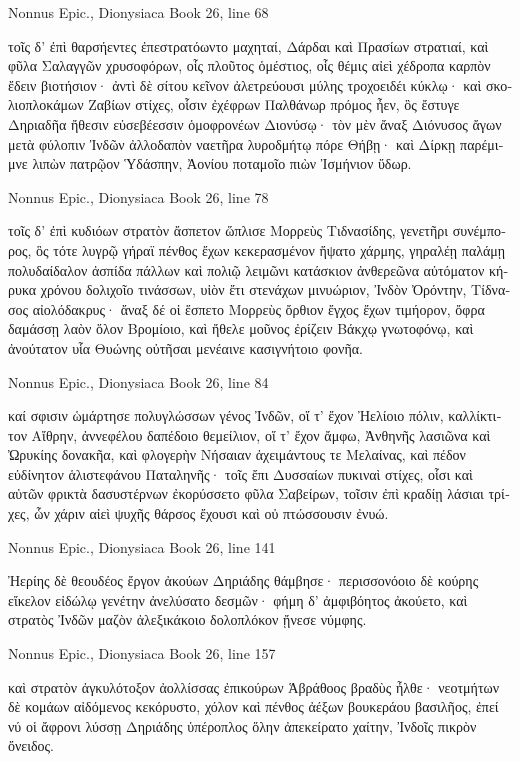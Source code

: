 \documentclass[12pt,letterpaper,twoside,final]{memoir}
\begin{document}
\begin{greek}
Nonnus Epic., Dionysiaca 
Book 26, line 68

τοῖς δ' ἐπὶ θαρσήεντες ἐπεστρατόωντο μαχηταί, 
Δάρδαι καὶ Πρασίων στρατιαί, καὶ φῦλα Σαλαγγῶν 
χρυσοφόρων, οἷς πλοῦτος ὁμέστιος, οἷς θέμις αἰεὶ 
χέδροπα καρπὸν ἔδειν βιοτήσιον· ἀντὶ δὲ σίτου 
κεῖνον ἀλετρεύουσι μύλης τροχοειδέι κύκλῳ· 
καὶ σκολιοπλοκάμων Ζαβίων στίχες, οἷσιν ἐχέφρων 
Παλθάνωρ πρόμος ἦεν, ὃς ἔστυγε Δηριαδῆα 
ἤθεσιν εὐσεβέεσσιν ὁμοφρονέων Διονύσῳ· 
τὸν μὲν ἄναξ Διόνυσος ἄγων μετὰ φύλοπιν Ἰνδῶν 
ἀλλοδαπὸν ναετῆρα λυροδμήτῳ πόρε Θήβῃ· 
καὶ Δίρκῃ παρέμιμνε λιπὼν πατρῷον Ὑδάσπην, 
Ἀονίου ποταμοῖο πιὼν Ἰσμήνιον ὕδωρ. 



Nonnus Epic., Dionysiaca 
Book 26, line 78

τοῖς δ' ἐπὶ κυδιόων στρατὸν ἄσπετον ὥπλισε Μορρεὺς 
Τιδνασίδης, γενετῆρι συνέμπορος, ὃς τότε λυγρῷ 
γήραϊ πένθος ἔχων κεκερασμένον ἥψατο χάρμης, 
γηραλέῃ παλάμῃ πολυδαίδαλον ἀσπίδα πάλλων 
καὶ πολιῷ λειμῶνι κατάσκιον ἀνθερεῶνα 
αὐτόματον κήρυκα χρόνου δολιχοῖο τινάσσων, 
υἱὸν ἔτι στενάχων μινυώριον, Ἰνδὸν Ὀρόντην, 
Τίδνασος αἰολόδακρυς· ἄναξ δέ οἱ ἕσπετο Μορρεὺς 
ὄρθιον ἔγχος ἔχων τιμήορον, ὄφρα δαμάσσῃ   
λαὸν ὅλον Βρομίοιο, καὶ ἤθελε μοῦνος ἐρίζειν 
Βάκχῳ γνωτοφόνῳ, καὶ ἀνούτατον υἷα Θυώνης 
οὐτῆσαι μενέαινε κασιγνήτοιο φονῆα. 



Nonnus Epic., Dionysiaca 
Book 26, line 84

καί σφισιν ὡμάρτησε πολυγλώσσων γένος Ἰνδῶν, 
οἵ τ' ἔχον Ἠελίοιο πόλιν, καλλίκτιτον Αἴθρην, 
ἀννεφέλου δαπέδοιο θεμείλιον, οἵ τ' ἔχον ἄμφω, 
Ἀνθηνῆς λασιῶνα καὶ Ὠρυκίης δονακῆα, 
καὶ φλογερὴν Νήσαιαν ἀχειμάντους τε Μελαίνας, 
καὶ πέδον εὐδίνητον ἁλιστεφάνου Παταληνῆς· 
τοῖς ἔπι Δυσσαίων πυκιναὶ στίχες, οἷσι καὶ αὐτῶν 
φρικτὰ δασυστέρνων ἐκορύσσετο φῦλα Σαβείρων, 
τοῖσιν ἐπὶ κραδίῃ λάσιαι τρίχες, ὧν χάριν αἰεὶ 
ψυχῆς θάρσος ἔχουσι καὶ οὐ πτώσσουσιν ἐνυώ. 



Nonnus Epic., Dionysiaca 
Book 26, line 141

           Ἠερίης δὲ θεουδέος ἔργον ἀκούων 
Δηριάδης θάμβησε· περισσονόοιο δὲ κούρης 
εἴκελον εἰδώλῳ γενέτην ἀνελύσατο δεσμῶν· 
φήμη δ' ἀμφιβόητος ἀκούετο, καὶ στρατὸς Ἰνδῶν 
μαζὸν ἀλεξικάκοιο δολοπλόκον ᾔνεσε νύμφης. 



Nonnus Epic., Dionysiaca 
Book 26, line 157

καὶ στρατὸν ἀγκυλότοξον ἀολλίσσας ἐπικούρων 
Ἁβράθοος βραδὺς ἦλθε· νεοτμήτων δὲ κομάων 
αἰδόμενος κεκόρυστο, χόλον καὶ πένθος ἀέξων 
βουκεράου βασιλῆος, ἐπεί νύ οἱ ἄφρονι λύσσῃ 
Δηριάδης ὑπέροπλος ὅλην ἀπεκείρατο χαίτην, 
Ἰνδοῖς πικρὸν ὄνειδος. 




\end{greek}
\end{document}
